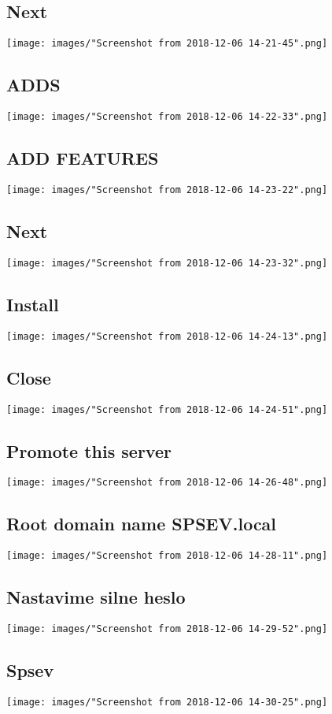 \documentclass[slovak]{article}
\begin{document}
  \subsection{Next}
  \texttt{[image: images/"Screenshot from 2018-12-06 14-21-45".png]}
  \subsection{ADDS}
  \texttt{[image: images/"Screenshot from 2018-12-06 14-22-33".png]}
  \subsection{ADD FEATURES}
  \texttt{[image: images/"Screenshot from 2018-12-06 14-23-22".png]}
  \subsection{Next}
  \texttt{[image: images/"Screenshot from 2018-12-06 14-23-32".png]}
  \subsection{Install}
  \texttt{[image: images/"Screenshot from 2018-12-06 14-24-13".png]}
  \subsection{Close}
  \texttt{[image: images/"Screenshot from 2018-12-06 14-24-51".png]}
  \subsection{Promote this server}
  \texttt{[image: images/"Screenshot from 2018-12-06 14-26-48".png]}
  \subsection{Root domain name SPSEV.local}
  \texttt{[image: images/"Screenshot from 2018-12-06 14-28-11".png]}
  \subsection{Nastavime silne heslo}
  \texttt{[image: images/"Screenshot from 2018-12-06 14-29-52".png]}
  \subsection{Spsev}
  \texttt{[image: images/"Screenshot from 2018-12-06 14-30-25".png]}
\end{document}

